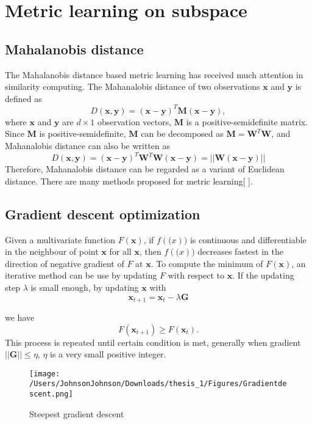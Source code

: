 \chapter{Metric learning on subspace}



\section{Mahalanobis distance}
The Mahalanobis distance based metric learning has received much attention in similarity computing. The Mahanalobis distance of two observations $\bm{x} $ and $\bm{y}$ is defined as
\begin{equation}
D(\bm{x},\bm{y}) = (\bm{x} - \bm{y})^T\bm{M}(\bm{x} - \bm{y}), 
\end{equation}
where $\bm{x}$ and $\bm{y} $ are $d\times1$ observation vectors, $\bm{M}$ is a positive-semidefinite matrix. Since $\bm{M}$ is positive-semidefinite, $\bm{M}$ can be decomposed as $\bm{M} = \bm{W}^T\bm{W}$, and Mahanalobis distance can also be written as 
\begin{equation}
D(\bm{x},\bm{y}) = (\bm{x} - \bm{y})^T\bm{W}^T\bm{W}(\bm{x} - \bm{y})= ||\bm{W}(\bm{x} - \bm{y})||
\end{equation}
 Therefore, Mahanalobis distance can be regarded as a variant of Euclidean distance. There are many methods proposed for metric learning[ ]. 
 
 \section{Gradient descent optimization}
 Given a multivariate function $F(\bm{x})$, if $f(\bm(x))$ is continuous and differentiable in the neighbour of point $\bm{x}$ for all $\bm{x}$, then $f(\bm(x))$ decreases fastest in the direction of negative gradient of $F$ at $\bm{x}$. To compute the minimum of $F(\bm{x})$, an iterative method can be use by updating $F$ with respect to $\bm{x}$. If the updating step $\lambda$ is small enough, by updating $\bm{x}$ with 
 \begin{equation}
 \bm{x}_{t+1} = \bm{x}_{t} - \lambda \bm{G}
 \end{equation}
 
 we have 
  \begin{equation}
 F(\bm{x}_{t+1}) \ge F(\bm{x}_t).
  \end{equation}
This process is repeated until certain condition is met, generally when gradient $||\bm{G}|| \le \eta$, $\eta$ is a very small positive integer. 
\begin{figure}
\centering
\texttt{[image: /Users/JohnsonJohnson/Downloads/thesis\_1/Figures/Gradientdescent.png]}
\caption{Steepest gradient descent}
\vspace{0em}
\end{figure} 

